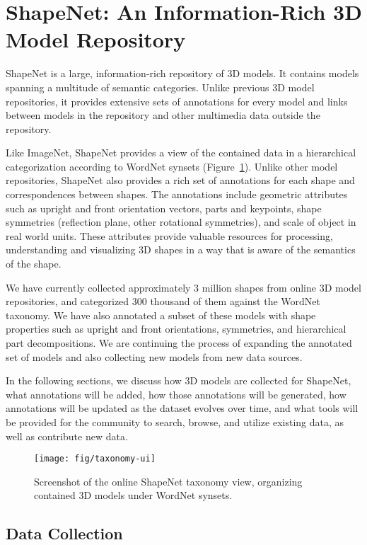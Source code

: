 \section{ShapeNet: An Information-Rich 3D Model Repository}
\label{sec:shapenet}
ShapeNet is a large, information-rich repository of 3D models. It contains models spanning a multitude of semantic categories. Unlike previous 3D model repositories, it provides extensive sets of annotations for every model and links between models in the repository and other multimedia data outside the repository.

Like ImageNet, ShapeNet provides a view of the contained data in a hierarchical categorization according to WordNet synsets (Figure~\ref{fig:taxonomy-ui}). Unlike other model repositories, ShapeNet also provides a rich set of annotations for each shape and correspondences between shapes. The annotations include geometric attributes such as upright and front orientation vectors, parts and keypoints, shape symmetries (reflection plane, other rotational symmetries), and scale of object in real world units. These attributes provide valuable resources for processing, understanding and visualizing 3D shapes in a way that is aware of the semantics of the shape.

We have currently collected approximately 3 million shapes from online 3D model repositories, and categorized 300 thousand of them against the WordNet taxonomy.  We have also annotated a subset of these models with shape properties such as upright and front orientations, symmetries, and hierarchical part decompositions. We are continuing the process of expanding the annotated set of models and also collecting new models from new data sources.

In the following sections, we discuss how 3D models are collected for ShapeNet, what annotations will be added, how those annotations will be generated, how annotations will be updated as the dataset evolves over time, and what tools will be provided for the community to search, browse, and utilize existing data, as well as contribute new data.

\begin{figure}
\texttt{[image: fig/taxonomy-ui]}
\caption{Screenshot of the online ShapeNet taxonomy view, organizing contained 3D models under WordNet synsets.}
\label{fig:taxonomy-ui}
\end{figure}

\subsection{Data Collection}

